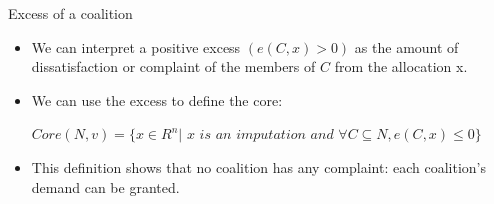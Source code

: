 \documentclass{beamer}
\begin{document}
\begin{frame}{Excess of a coalition}

    \begin{itemize}
        \item We can interpret a positive excess $(e(C,x) > 0)$ as the amount of dissatisfaction or {\color{blue} complaint} of the members of $C$ from the allocation x.
        \item We can use the excess to define the core:
        \begin{center}
            $Core(N,v)=\{x \in R^n |$ $x$ $is$ $an$ $imputation$ $and$ $\forall C \subseteq N, e(C,x) \leq 0\}$
        \end{center}
        \item This definition shows that no coalition has any complaint: each coalition's demand can be granted.
    \end{itemize}

\end{frame}
\end{document}
